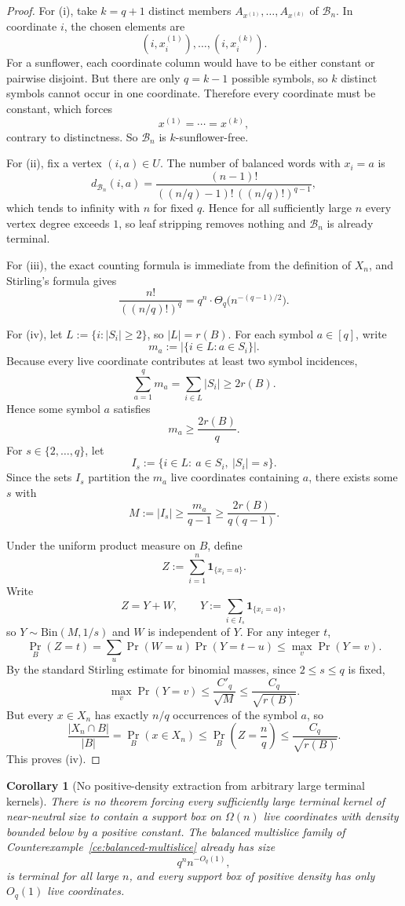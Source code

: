 \documentclass[11pt]{article}
\newtheorem{corollary}[theorem]{Corollary}
\theoremstyle{definition}
\newcommand{\1}{\mathbf{1}}
\begin{document}
\begin{proof}
For (i), take $k=q+1$ distinct members $A_{x^{(1)}},\dots,A_{x^{(k)}}$ of $\mathcal B_n$. In coordinate $i$, the chosen elements are
\[
(i,x_i^{(1)}),\dots,(i,x_i^{(k)}).
\]
For a sunflower, each coordinate column would have to be either constant or pairwise disjoint. But there are only $q=k-1$ possible symbols, so $k$ distinct symbols cannot occur in one coordinate. Therefore every coordinate must be constant, which forces
\[
x^{(1)}=\cdots=x^{(k)},
\]
contrary to distinctness. So $\mathcal B_n$ is $k$-sunflower-free.

For (ii), fix a vertex $(i,a)\in U$. The number of balanced words with $x_i=a$ is
\[
d_{\mathcal B_n}(i,a)=
\frac{(n-1)!}{((n/q)-1)!\,((n/q)!)^{q-1}},
\]
which tends to infinity with $n$ for fixed $q$. Hence for all sufficiently large $n$ every vertex degree exceeds $1$, so leaf stripping removes nothing and $\mathcal B_n$ is already terminal.

For (iii), the exact counting formula is immediate from the definition of $X_n$, and Stirling's formula gives
\[
\frac{n!}{((n/q)!)^q}
=
q^n\cdot \Theta_q\bigl(n^{-(q-1)/2}\bigr).
\]

For (iv), let $L:=\{i:|S_i|\ge 2\}$, so $|L|=r(B)$. For each symbol $a\in [q]$, write
\[
m_a:=|\{i\in L:a\in S_i\}|.
\]
Because every live coordinate contributes at least two symbol incidences,
\[
\sum_{a=1}^q m_a=\sum_{i\in L}|S_i|\ge 2r(B).
\]
Hence some symbol $a$ satisfies
\[
m_a\ge \frac{2r(B)}{q}.
\]
For $s\in \{2,\dots,q\}$, let
\[
I_s:=\{i\in L:\ a\in S_i,\ |S_i|=s\}.
\]
Since the sets $I_s$ partition the $m_a$ live coordinates containing $a$, there exists some $s$ with
\[
M:=|I_s|\ge \frac{m_a}{q-1}\ge \frac{2r(B)}{q(q-1)}.
\]

Under the uniform product measure on $B$, define
\[
Z:=\sum_{i=1}^n \mathbf 1_{\{x_i=a\}}.
\]
Write
\[
Z=Y+W,
\qquad
Y:=\sum_{i\in I_s}\mathbf 1_{\{x_i=a\}},
\]
so $Y\sim \mathrm{Bin}(M,1/s)$ and $W$ is independent of $Y$. For any integer $t$,
\[
\Pr_B(Z=t)=\sum_u \Pr(W=u)\Pr(Y=t-u)\le \max_v \Pr(Y=v).
\]
By the standard Stirling estimate for binomial masses, since $2\le s\le q$ is fixed,
\[
\max_v \Pr(Y=v)\le \frac{C'_q}{\sqrt{M}}\le \frac{C_q}{\sqrt{r(B)}}.
\]
But every $x\in X_n$ has exactly $n/q$ occurrences of the symbol $a$, so
\[
\frac{|X_n\cap B|}{|B|}
=
\Pr_B(x\in X_n)
\le
\Pr_B\!\left(Z=\frac{n}{q}\right)
\le
\frac{C_q}{\sqrt{r(B)}}.
\]
This proves (iv).
\end{proof}

\begin{corollary}[No positive-density extraction from arbitrary large terminal kernels]\label{cor:no-positive-density-extraction}
There is no theorem forcing every sufficiently large terminal kernel of near-neutral size to contain a support box on $\Omega(n)$ live coordinates with density bounded below by a positive constant. The balanced multislice family of Counterexample~\ref{ce:balanced-multislice} already has size
\[
q^n n^{-O_q(1)},
\]
is terminal for all large $n$, and every support box of positive density has only $O_q(1)$ live coordinates.
\end{corollary}
\end{document}
